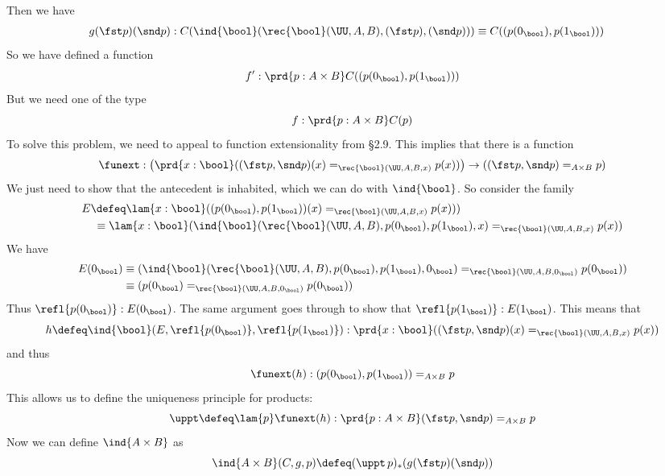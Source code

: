     Then we have
    \begin{align*}
    g(\fst p)(\snd p) 
    &: C(\ind{\bool}(\rec{\bool}(\UU, A, B), (\fst p), (\snd p)))
    \equiv 
    C((p(0_{\bool}), p(1_{\bool})))
    \end{align*}
    So we have defined a function
    \[
    f' : \prd{p : A \times B} C((p(0_{\bool}), p(1_{\bool})))
    \]
    But we need one of the type
    \[
    f : \prd{p : A \times B} C(p)
    \]
    To solve this problem, we need to appeal to function extensionality from \S2.9.
    This implies that there is a function
    \[
    \funext : 
    \left(\prd{x:\bool} ((\fst p, \snd p)(x) =_{\rec{\bool}(\UU, A, B, x)} p(x))\right)
    \to 
    ((\fst p, \snd p) =_{A \times B} p)
    \]
We just need to show that the antecedent is inhabited, which we can do with
$\ind{\bool}$.  So consider the family
\begin{align*}
E &\defeq 
\lam{x : \bool} 
((p(0_{\bool}), p(1_{\bool}))(x) =_{\rec{\bool}(\UU, A, B, x)}  p(x)))
\\&\phantom{:}\equiv
\lam{x : \bool} 
(\ind{\bool}(\rec{\bool}(\UU, A, B), p(0_{\bool}), p(1_{\bool}), x)
=_{\rec{\bool}(\UU, A, B, x)} p(x))
\end{align*}
We have
\begin{align*}
E(0_{\bool})
&\equiv
(\ind{\bool}(\rec{\bool}(\UU, A, B),
p(0_{\bool}), p(1_{\bool}), 0_{\bool}) =_{\rec{\bool}(\UU, A, B, 0_{\bool})}
p(0_{\bool}))
\\&\equiv
(p(0_{\bool}) =_{\rec{\bool}(\UU, A, B, 0_{\bool})} p(0_{\bool}))
\end{align*}
Thus $\refl{p(0_{\bool})} : E(0_{\bool})$.  The same argument goes through to
show that $\refl{p(1_{\bool})} : E(1_{\bool})$.  This means that
\[
h \defeq
\ind{\bool}(E, \refl{p(0_{\bool})}, \refl{p(1_{\bool})})
:
\prd{x : \bool} ((\fst p, \snd p)(x) =_{\rec{\bool}(\UU, A, B, x)} p(x))
\]
and thus
\[
\funext(h) 
: 
(p(0_{\bool}), p(1_{\bool}))
=_{A \times B} 
p 
\]
This allows us to define the uniqueness principle for products:
\[
  \uppt \defeq \lam{p}\funext(h)  
  : \prd{p:A \times B} 
  (\fst p, \snd p)
  =_{A \times B} 
  p 
\]
Now we can define $\ind{A\times B}$ as
\[
  \ind{A\times B}(C, g, p) \defeq (\uppt\, p)_{*}(g(\fst p)(\snd p))
\]
